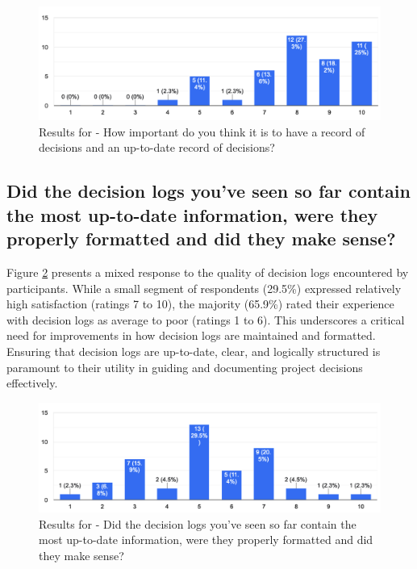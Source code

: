 \begin{figure}[h!]
\centering
\includegraphics[width=\linewidth]{Images/Survey/decisions_1.png}
\caption{Results for - How important do you think it is to have a record of decisions and an up-to-date record of decisions?}
\label{fig:results:decisions:1}
\end{figure}

\pagebreak

\subsection*{Did the decision logs you've seen so far contain the most up-to-date information, were they properly formatted and did they make sense?}
Figure \ref{fig:results:decisions:2} presents a mixed response to the quality of decision logs encountered by participants. While a small segment of respondents (29.5\%) expressed relatively high satisfaction (ratings 7 to 10), the majority (65.9\%) rated their experience with decision logs as average to poor (ratings 1 to 6). This underscores a critical need for improvements in how decision logs are maintained and formatted. Ensuring that decision logs are up-to-date, clear, and logically structured is paramount to their utility in guiding and documenting project decisions effectively.

\begin{figure}[h!]
\centering
\includegraphics[width=\linewidth]{Images/Survey/decisions_2.png}
\caption{Results for - Did the decision logs you've seen so far contain the most up-to-date information, were they properly formatted and did they make sense?}
\label{fig:results:decisions:2}
\end{figure}

